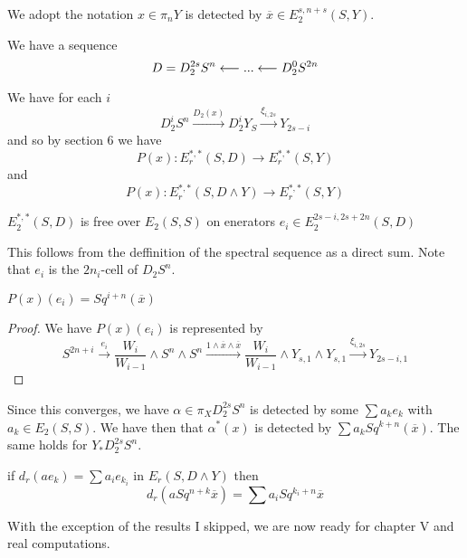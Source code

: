 We adopt the notation $x\in \pi_nY$ is detected by $\overline{x}\in E_2^{s,n+s}(S,Y)$.  

We have a sequence 
\[D=D_2^{2s}S^n\longleftarrow ...\longleftarrow D_2^0S^{2n}\]  

We have for each $i$
\[D^i_2S^n\xrightarrow{D_2(x)} D^i_2Y_S\xrightarrow{\xi_{i,2s}} Y_{2s-i}\]
and so by section 6 we have
\[P(x):E^{*,*}_r(S,D)\to E^{*,*}_r(S,Y)\]
and
\[P(x):E^{*,*}_r(S,D\wedge Y)\to E^{*,*}_r(S,Y)\]

\begin{Lemma}
  $E_2^{*,*}(S,D)$ is free over $E_2(S,S)$ on enerators $e_i\in E_2^{2s-i,2s+2n}(S,D)$
\end{Lemma}

This follows from the deffinition of the spectral sequence as a direct sum.  
Note that $e_i$ is the $2n_i$-cell of $D_2S^n$.

\begin{Theorem}
  $P(x)(e_i)=Sq^{i+n}(\overline{x})$
\end{Theorem}

\begin{proof}
  We have $P(x)(e_i)$ is represented by
  \[S^{2n+i}\xrightarrow{e_i} \frac{W_i}{W_{i-1}}\wedge S^n\wedge S^n\xrightarrow{1\wedge \overline{x}\wedge \overline{x}}\frac{W_i}{W_{i-1}}\wedge Y_{s,1}\wedge Y_{s,1}
  \xrightarrow{\xi_{i,2s}} Y_{2s-i,1}\]
\end{proof}

Since this converges, we have $\alpha\in \pi_XD^{2s}_2S^n$ is detected by some $\sum a_ke_k$ with $a_k\in E_2(S,S)$.  
We have then that $\alpha^*(x)$ is detected by $\sum a_kSq^{k+n}(\overline{x})$.  The same holds for $Y_*D_2^{2s}S^n$.  

\begin{Lemma}
  if $d_r(ae_k)=\sum a_ie_{k_i}$ in $E_r(S,D\wedge Y)$ then 
  \[d_r(aSq^{n+k}\overline{x})=\sum a_iSq^{k_i+n}\overline{x}\]
\end{Lemma}

With the exception of the results I skipped, we are now ready for chapter V and real computations.

